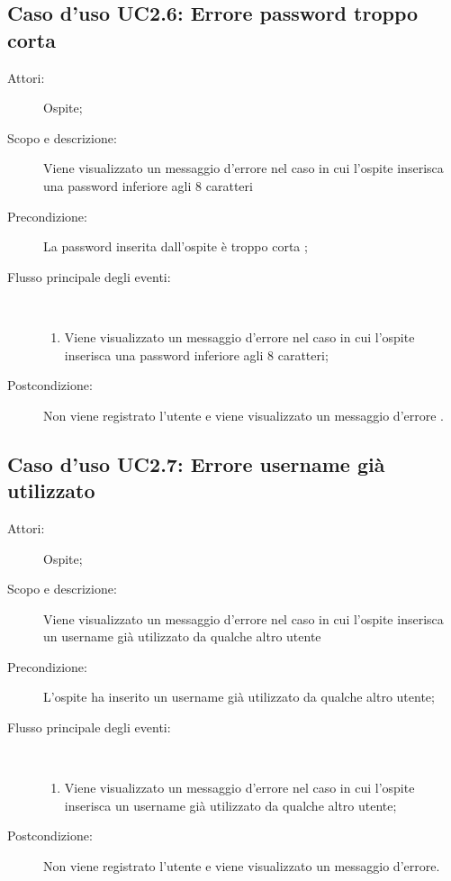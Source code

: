 \subsection{Caso d'uso UC2.6: Errore password troppo corta}\begin{description}
	\item[Attori:] Ospite;
	\item[Scopo e descrizione:] Viene visualizzato un messaggio d'errore nel caso in cui l'ospite inserisca una password inferiore agli 8 caratteri
	\item[Precondizione:] La password inserita dall'ospite è troppo corta
	;
	
	\item[Flusso principale degli eventi:] \ 
	\begin{enumerate}
		\item Viene visualizzato un messaggio d'errore nel caso in cui l'ospite inserisca una password inferiore agli 8 caratteri;
		
	\end{enumerate}
	\item[Postcondizione:] Non viene registrato l'utente e viene visualizzato un messaggio d'errore
	.
\end{description}
\hypertarget{UC2.7}{}
\subsection{Caso d'uso UC2.7: Errore username già utilizzato}\begin{description}
	\item[Attori:] Ospite;
	\item[Scopo e descrizione:] Viene visualizzato un messaggio d'errore nel caso in cui l'ospite inserisca un username già utilizzato da qualche altro utente
	\item[Precondizione:] L'ospite ha inserito un username già utilizzato da qualche altro utente;
	
	\item[Flusso principale degli eventi:] \ 
	\begin{enumerate}
		\item Viene visualizzato un messaggio d'errore nel caso in cui l'ospite inserisca un username già utilizzato da qualche altro utente;
		
	\end{enumerate}
	\item[Postcondizione:] Non viene registrato l'utente e viene visualizzato un messaggio d'errore.
\end{description}
\hypertarget{UC3}{}
